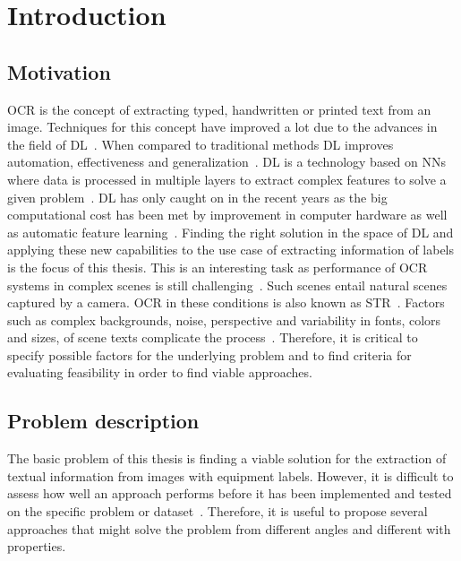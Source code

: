 \chapter{Introduction}\label{ch:intro}
\section{Motivation}
\ac{OCR} is the concept of extracting typed, handwritten or printed text
from an image.
Techniques for this concept have improved a lot due to the advances in the field of
\ac{DL}~\citep{zhao_improving_2020}.
When compared to traditional methods \ac{DL} improves automation, effectiveness and
generalization~\citep{chen_text_2021}.
\ac{DL} is a technology based on \acp{NN} where data is processed
in multiple layers to extract complex features to solve a given problem~\citep{shrestha_review_2019}.
\ac{DL} has only caught on in the recent years as the big computational cost has been met
by improvement in computer hardware as well as automatic feature
learning~\citep{ponti_everything_2017, chen_text_2021}.
Finding the right solution in the space of \ac{DL} and applying these new capabilities to
the use case of extracting information of labels is the focus of this thesis.
This is an interesting task as performance of \ac{OCR} systems in complex scenes is still
challenging~\citep{zhao_improving_2020}.
Such scenes entail natural scenes captured by a camera.
\ac{OCR} in these conditions is also known as \ac{STR}~\citep{chen_text_2021}.
Factors such as complex backgrounds, noise, perspective and variability in fonts, colors and sizes,
of scene texts complicate the process~\citep{hu_gtc_2020,chen_text_2021}.
Therefore, it is critical to specify possible factors for the underlying problem and to find
criteria for evaluating feasibility in order to find viable approaches.

\section{Problem description}\label{se:problem}
The basic problem of this thesis is finding a viable solution for the extraction of textual
information from images with equipment labels.
However, it is difficult to assess how well an approach performs before it has been implemented and
tested on the specific problem or dataset~\citep{arpteg_software_2018}.
Therefore, it is useful to propose several approaches that might solve the problem from
different angles and different with properties.

